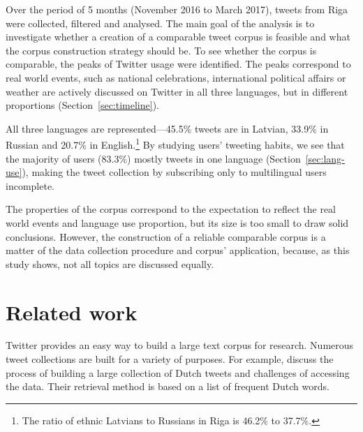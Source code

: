 \documentclass[11pt,a4paper]{article}
\begin{document}

Over the period of 5 months (November 2016 to March 2017), tweets from Riga were collected, filtered and analysed.\footnotemark{} The main goal of the analysis is to investigate whether a creation of a comparable tweet corpus is feasible and what the corpus construction strategy should be. To see whether the corpus is comparable, the peaks of Twitter usage were identified. The peaks correspond to real world events, such as national celebrations, international political affairs or weather are actively discussed on Twitter in all three languages, but in different proportions (Section~\ref{sec:timeline}).


All three languages are represented---45.5\% tweets are in Latvian, 33.9\% in Russian and 20.7\% in English.\footnote{
The ratio of ethnic Latvians to Russians in Riga is 46.2\% to 37.7\%.}
By studying users' tweeting habits, we see that the majority of users (83.3\%) mostly tweets in one language (Section~\ref{sec:lang-use}), making the tweet collection by subscribing only to multilingual users incomplete.

The properties of the corpus correspond to the expectation to reflect the real world events and language use proportion, but its size is too small to draw solid conclusions. However, the construction of a reliable comparable corpus is a matter of the data collection procedure and corpus' application, because, as this study shows, not all topics are discussed equally.


\section{Related work}

Twitter %
provides an easy way to build a large text corpus for research. Numerous tweet collections are built for a variety of purposes. For example, \citet{sang2013} discuss the process of building a large collection of Dutch tweets and challenges of accessing the data. %
Their retrieval method is based on a list of frequent Dutch words.
\end{document}
